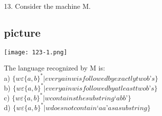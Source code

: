 \documentclass[9pt]{beamer}
\begin{document}
\begin{frame}
13. Consider the machine M.\\

\begin{center}
\section{picture}
\texttt{[image: 123-1.png]}
\end{center}

\vspace*{0.2cm}
\hspace{0.5cm}
The language recognized by M is:\\

\vspace*{0.2cm}
\hspace{0.5cm}
a) $\{w \varepsilon\{a, b\}^{*} | every a in w is followed by exactly two b’s\}$\\
\hspace{0.5cm}
b) $\{w \varepsilon\{a, b\}^{*} | every a in w is followed by at least two b’s\}$\\
\hspace{0.5cm}
c) $\{w \varepsilon\{a, b\}^{*} | w contains the substring ‘abb’\}$\\
\hspace{0.5cm}
d) $\{w \varepsilon\{a, b\}^{*} | w does not contain ‘aa’ as a substring\}$\\
\end{frame}
\end{document}
